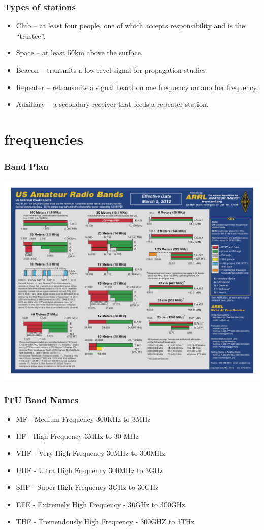 \documentclass[10pt]{beamer}
\begin{document}
\begin{frame}
\frametitle{Types of stations}
\begin{itemize}
\item Club – at least four  people, one of which accepts responsibility and is the “trustee”.
\item Space – at least 50km above the surface.
\item Beacon --  transmits a low-level signal for propagation studies
\item Repeater – retransmits  a signal heard on one frequency on another frequency.
\item Auxillary – a secondary receiver that feeds a repeater station.  
\end{itemize}
\end{frame}

\section{frequencies}

\begin{frame}
\frametitle{Band Plan}
\begin{center}
\includegraphics[width=\textwidth]{hambandscolor.pdf}
\end{center}
\end{frame}

\begin{frame}
\frametitle{ITU Band Names}
\begin{itemize}
\item MF - Medium Frequency 300KHz to 3MHz
\item HF - High Frequency 3MHz to 30 MHz
\item VHF - Very High Frequency 30MHz to 300MHz
\item UHF - Ultra High Frequency 300MHz to 3GHz
\item SHF - Super High Frequency 3GHz to 30GHz
\item EFE - Extremely High Frequency - 30GHz to 300GHz
\item THF - Tremendously High Frequency - 300GHZ to 3THz
\end{itemize}
\end{frame}
\end{document}

